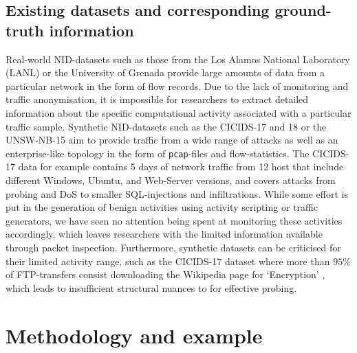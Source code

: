 \documentclass[runningheads]{llncs}
\begin{document}
\subsection{Existing datasets and corresponding ground-truth information}\label{Sec:ExData}

Real-world NID-datasets such as those from the Los Alamos National Laboratory \cite{kent-2015-cyberdata1} (LANL) or the University of Grenada \cite{macia2018ugr} provide large amounts of data from a particular network in the form of flow records. Due to the lack of monitoring and traffic anonymisation, it is impossible for researchers to extract detailed information about the specific computational activity associated with a particular traffic sample.
Synthetic NID-datasets such as the CICIDS-17 and 18 \cite{sharafaldin2018toward} or the UNSW-NB-15 \cite{moustafa2015unsw} aim to provide traffic from a wide range of attacks as well as an enterprise-like topology in the form of \texttt{pcap}-files and flow-statistics. The CICIDS-17 data for example contains 5 days of network traffic from 12 host that include different Windows, Ubuntu, and Web-Server versions, and covers attacks from probing and DoS to smaller SQL-injections and infiltrations.
While some effort is put in the generation of benign activities using activity scripting or traffic generators, we have seen no attention being spent at monitoring these activities accordingly, which leaves researchers with the limited information available through packet inspection. Furthermore, synthetic datasets can be criticised for their limited activity range, such as the CICIDS-17 dataset where more than $95\%$ of FTP-transfers consist downloading the Wikipedia page for ‘Encryption’ \cite{ring2019survey}, which leads to insufficient structural nuances to for effective probing.


\section{Methodology and example}\label{Sec:Motivation}




\end{document}
